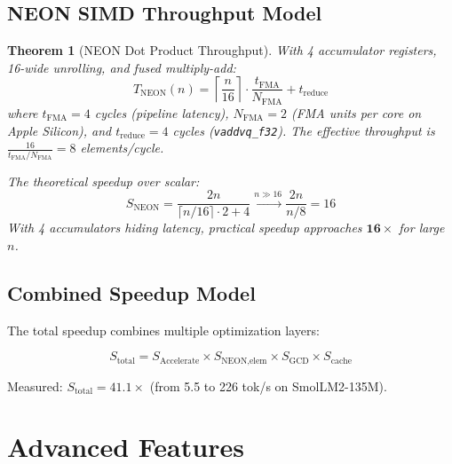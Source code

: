 \documentclass[12pt,a4paper]{article}
\newtheorem{theorem}{Theorem}[section]
\begin{document}
\subsection{NEON SIMD Throughput Model}

\begin{theorem}[NEON Dot Product Throughput]
\label{thm:neon}
With 4 accumulator registers, 16-wide unrolling, and fused multiply-add:
\begin{equation}
T_{\text{NEON}}(n) = \left\lceil \frac{n}{16} \right\rceil \cdot \frac{t_{\text{FMA}}}{N_{\text{FMA}}} + t_{\text{reduce}}
\label{eq:neon_time}
\end{equation}
where $t_{\text{FMA}} = 4$ cycles (pipeline latency), $N_{\text{FMA}} = 2$ (FMA units per core on Apple Silicon), and $t_{\text{reduce}} = 4$ cycles (\texttt{vaddvq\_f32}). The effective throughput is $\frac{16}{t_{\text{FMA}}/N_{\text{FMA}}} = 8$ elements/cycle.

The theoretical speedup over scalar:
\begin{equation}
S_{\text{NEON}} = \frac{2n}{\lceil n/16 \rceil \cdot 2 + 4} \xrightarrow{n \gg 16} \frac{2n}{n/8} = 16
\label{eq:neon_speedup}
\end{equation}
With 4 accumulators hiding latency, practical speedup approaches $\mathbf{16\times}$ for large $n$.
\end{theorem}

\subsection{Combined Speedup Model}

The total speedup combines multiple optimization layers:

\begin{equation}
S_{\text{total}} = S_{\text{Accelerate}} \times S_{\text{NEON,elem}} \times S_{\text{GCD}} \times S_{\text{cache}}
\label{eq:total_speedup}
\end{equation}

Measured: $S_{\text{total}} = 41.1\times$ (from 5.5 to 226 tok/s on SmolLM2-135M).

\section{Advanced Features}
\label{sec:advanced}
\end{document}
